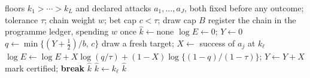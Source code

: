 \begin{algorithm}[t]
\caption{Release chain with the registered betting gate}\label{alg:chain}
\begin{algorithmic}[1]
\Require floors $k_1>\cdots>k_L$ and declared attacks $a_1,\ldots,a_J$, both fixed before
  any outcome; tolerance $\tau$; chain weight $w$; bet cap $c<\tau$; draw cap $B$
\State register the chain in the programme ledger, spending $w$ once
\State $\hat k\gets\text{none}$
   
    \State $\log E\gets0$; $Y\gets0$
      \State $q\gets\min\{(Y+\tfrac12)/b,\,c\}$ 
      \State draw a fresh target; $X\gets$ success of $a_j$ at $k_\ell$
      \State $\log E\gets\log E+X\log(q/\tau)+(1-X)\log\{(1-q)/(1-\tau)\}$; $Y\gets Y+X$
       mark certified; \textbf{break}
      \EndIf
    \EndFor
     \Return $\hat k$ 
    \EndIf
  \EndFor
  \State $\hat k\gets k_\ell$ 
\EndFor
\State \Return $\hat k$
\end{algorithmic}
\end{algorithm}

